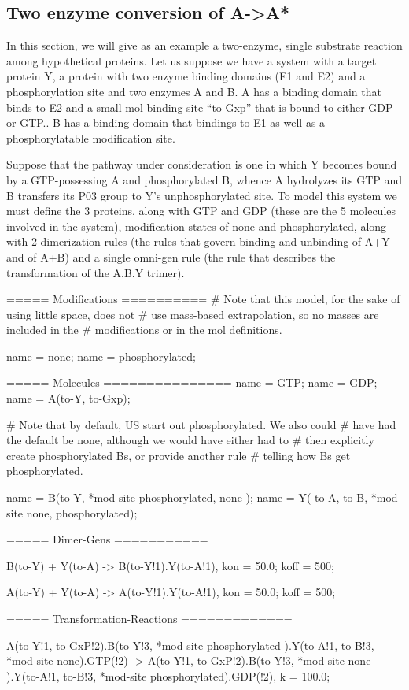 \subsection{Two enzyme conversion of A->A*}
In this section, we will give as an example a two-enzyme, single
substrate reaction among hypothetical proteins.  Let us suppose we
have a system with a target protein Y, a protein with two enzyme
binding domains (E1 and E2) and a phosphorylation site and two enzymes
A and B.  A has a binding domain that binds to E2 and a small-mol
binding site ``to-Gxp'' that is bound to either GDP or GTP..  B has a
binding domain that bindings to E1 as well as a phosphorylatable
modification site.  

Suppose that the pathway under consideration is one in
which Y becomes bound by a GTP-possessing A and phosphorylated B,
whence A hydrolyzes its GTP and B transfers its P03 group to Y's
unphosphorylated site.  To model this system we must define the 3
proteins, along with GTP and GDP (these are the 5 molecules involved
in the system), modification states of none and phosphorylated, along
with 2 dimerization rules (the rules that govern binding and unbinding
of A+Y and of A+B) and a single omni-gen rule (the rule that describes
the transformation of the A.B.Y trimer).

\begin{ExampleMZR}
===== Modifications ==========
# Note that this model, for the sake of using little space, does not
# use mass-based extrapolation, so no masses are included in the
# modifications or in the mol definitions.

name = none;
name = phosphorylated;


===== Molecules ===============
name = GTP;
name = GDP;
name = A(to-Y, to-Gxp);

# Note that by default, US start out phosphorylated.  We also could
# have had the default be none, although we would have either had to
# then explicitly create phosphorylated Bs, or provide another rule
# telling how Bs get phosphorylated.

name = B(to-Y, *mod-site {phosphorylated, none} );
name = Y( to-A, to-B, *mod-site {none, phosphorylated});

===== Dimer-Gens ===========

B(to-Y) + Y(to-A) -> B(to-Y!1).Y(to-A!1),
   kon = 50.0;
   koff = 500;

A(to-Y) + Y(to-A) -> A(to-Y!1).Y(to-A!1),
   kon = 50.0;
   koff = 500;

===== Transformation-Reactions =============

A(to-Y!1, to-GxP!2).B(to-Y!3, *mod-site {phosphorylated} ).Y(to-A!1, to-B!3, *mod-site {none}).GTP(!2) ->
  A(to-Y!1, to-GxP!2).B(to-Y!3, *mod-site {none} ).Y(to-A!1, to-B!3, *mod-site {phosphorylated}).GDP(!2),
  k = 100.0;


\end{ExampleMZR}


